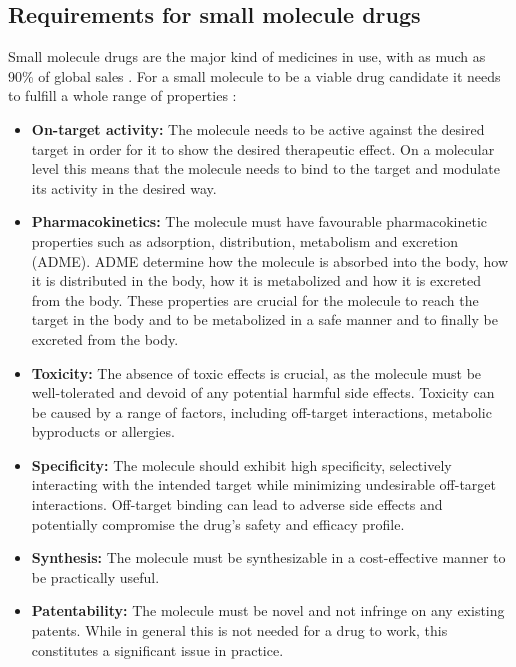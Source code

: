 \subsection{Requirements for small molecule drugs\label{sec:requirements}}
Small molecule drugs are the major kind of medicines in use, with as much as
90\% of global sales \citep{makurvetBiologicsVsSmall2021}.
For a small molecule to be a viable drug candidate it needs to fulfill a whole range 
of properties \citep{todo}:
\begin{itemize}
    \item \textbf{On-target activity:} The molecule needs to be active against
    the desired target in order for it to show the desired therapeutic effect.
    On a molecular level this means that the molecule needs to bind to the target
    and modulate its activity in the desired way. 
    \item \textbf{Pharmacokinetics:} The molecule must have favourable
    pharmacokinetic properties such as adsorption, distribution, metabolism and
    excretion (ADME). ADME determine how the molecule is absorbed into the
    body, how it is distributed in the body, how it is metabolized and how it is
    excreted from the body. These properties are crucial for the molecule to
    reach the target in the body and to be metabolized in a safe manner and to 
    finally be excreted from the body.
    \item \textbf{Toxicity:}  The absence of toxic effects is crucial, as the
    molecule must be well-tolerated and devoid of any potential harmful side
    effects. Toxicity can be caused by a range of factors, including off-target
    interactions, metabolic byproducts or allergies.
    \item \textbf{Specificity:}  The molecule should exhibit high specificity,
    selectively interacting with the intended target while minimizing
    undesirable off-target interactions. Off-target binding can lead to adverse
    side effects and potentially compromise the drug's safety and efficacy
    profile.
    \item \textbf{Synthesis:} The molecule must be synthesizable in a
    cost-effective manner to be practically useful.
    \item \textbf{Patentability:} The molecule must be novel and not infringe on
    any existing patents. While in general this is not needed for a drug to work, 
    this constitutes a significant issue in practice.
\end{itemize}

